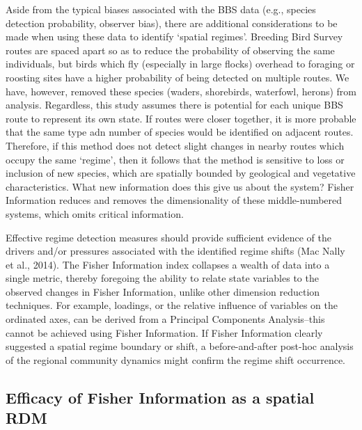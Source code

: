 \documentclass[12pt,twoside,openany]{reedthesis}
\begin{document}
Aside from the typical biases associated with the BBS data (e.g., species detection probability, observer bias), there are additional considerations to be made when using these data to identify `spatial regimes'. Breeding Bird Survey routes are spaced apart so as to reduce the probability of observing the same individuals, but birds which fly (especially in large flocks) overhead to foraging or roosting sites have a higher probability of being detected on multiple routes. We have, however, removed these species (waders, shorebirds, waterfowl, herons) from analysis. Regardless, this study assumes there is potential for each unique BBS route to represent its own state. If routes were closer together, it is more probable that the same type adn number of species would be identified on adjacent routes. Therefore, if this method does not detect slight changes in nearby routes which occupy the same `regime', then it follows that the method is sensitive to loss or inclusion of new species, which are spatially bounded by geological and vegetative characteristics. What new information does this give us about the system? Fisher Information reduces and removes the dimensionality of these middle-numbered systems, which omits critical information.

Effective regime detection measures should provide sufficient evidence of the drivers and/or pressures associated with the identified regime shifts (Mac Nally et al., 2014). The Fisher Information index collapses a wealth of data into a single metric, thereby foregoing the ability to relate state variables to the observed changes in Fisher Information, unlike other dimension reduction techniques. For example, loadings, or the relative influence of variables on the ordinated axes, can be derived from a Principal Components Analysis--this cannot be achieved using Fisher Information. If Fisher Information clearly suggested a spatial regime boundary or shift, a before-and-after post-hoc analysis of the regional community dynamics might confirm the regime shift occurrence.

\hypertarget{efficacy-of-fisher-information-as-a-spatial-rdm}{%
\subsection{Efficacy of Fisher Information as a spatial RDM}\label{efficacy-of-fisher-information-as-a-spatial-rdm}}
\end{document}
